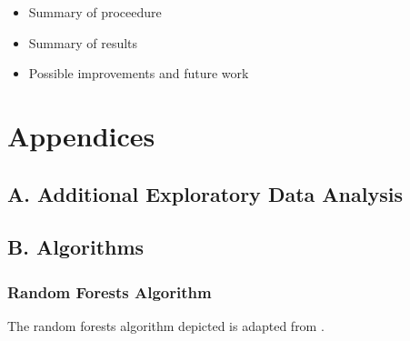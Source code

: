 \documentclass[12pt,]{article}
\providecommand{\tightlist}{%
  \setlength{\itemsep}{0pt}\setlength{\parskip}{0pt}}
\newcommand{\appendixA}{ \setcounter{table}{0} \renewcommand{\thetable}{A\arabic{table}} \setcounter{figure}{0} \renewcommand{\thefigure}{A\arabic{figure}} }
\newcommand{\appendixB}{ \setcounter{table}{0} \renewcommand{\thetable}{B\arabic{table}} \setcounter{figure}{0} \renewcommand{\thefigure}{B\arabic{figure}} }
\begin{document}
\begin{itemize}
\tightlist
\item
  Summary of proceedure
\item
  Summary of results
\item
  Possible improvements and future work
\end{itemize}

\newpage

\section*{Appendices}\label{appendices}

\subsection*{A. Additional Exploratory Data
Analysis}\label{a.-additional-exploratory-data-analysis}

\appendixA

\subsection*{B. Algorithms}\label{b.-algorithms}

\appendixB

\subsubsection{Random Forests Algorithm}\label{random-forests-algorithm}

The random forests algorithm depicted is adapted from
\citep{hastie_elements_2009}.
\end{document}
